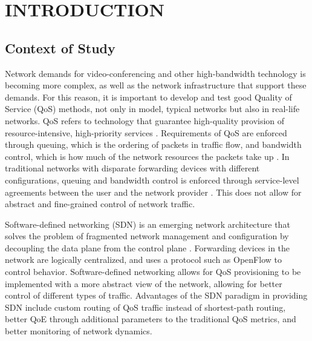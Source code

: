 \chapter{INTRODUCTION}

\section{Context of Study}

Network demands for video-conferencing and other high-bandwidth technology is becoming more complex, as well as the network infrastructure that support these demands. For this reason, it is important to develop and test good Quality of Service (QoS) methods, not only in model, typical networks but also in real-life networks. QoS refers to technology that guarantee high-quality provision of resource-intensive, high-priority services \cite{noauthor_what_nodate}. Requirements of QoS are enforced through queuing, which is the ordering of packets in traffic flow, and bandwidth control, which is how much of the network resources the packets take up \cite{zhao_internet_2000}. In traditional networks with disparate forwarding devices with different configurations, queuing and bandwidth control is enforced through service-level agreements between the user and the network provider \cite{karakus_quality_2017}. This does not allow for abstract and fine-grained control of network traffic.

Software-defined networking (SDN) is an emerging network architecture that solves the problem of fragmented network management and configuration by decoupling the data plane from the control plane \cite{kreutz_software-defined_2015}. Forwarding devices in the network are logically centralized, and uses a protocol such as OpenFlow to control behavior. Software-defined networking allows for QoS provisioning to be implemented with a more abstract view of the network, allowing for better control of different types of traffic. Advantages of the SDN paradigm in providing SDN include custom routing of QoS traffic instead of shortest-path routing, better QoE through additional parameters to the traditional QoS metrics, and better monitoring of network dynamics.

